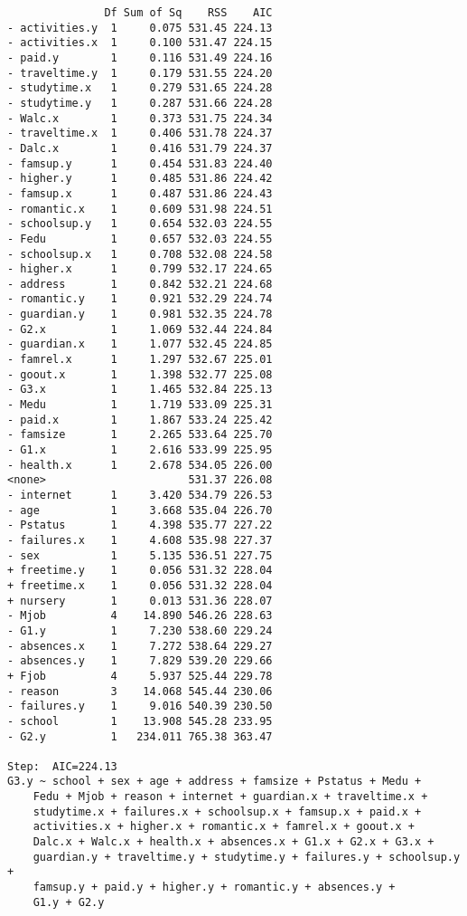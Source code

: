 \documentclass[11pt]{article}
\begin{document}
\begin{enumerate}
\begin{verbatim}
               Df Sum of Sq    RSS    AIC
- activities.y  1     0.075 531.45 224.13
- activities.x  1     0.100 531.47 224.15
- paid.y        1     0.116 531.49 224.16
- traveltime.y  1     0.179 531.55 224.20
- studytime.x   1     0.279 531.65 224.28
- studytime.y   1     0.287 531.66 224.28
- Walc.x        1     0.373 531.75 224.34
- traveltime.x  1     0.406 531.78 224.37
- Dalc.x        1     0.416 531.79 224.37
- famsup.y      1     0.454 531.83 224.40
- higher.y      1     0.485 531.86 224.42
- famsup.x      1     0.487 531.86 224.43
- romantic.x    1     0.609 531.98 224.51
- schoolsup.y   1     0.654 532.03 224.55
- Fedu          1     0.657 532.03 224.55
- schoolsup.x   1     0.708 532.08 224.58
- higher.x      1     0.799 532.17 224.65
- address       1     0.842 532.21 224.68
- romantic.y    1     0.921 532.29 224.74
- guardian.y    1     0.981 532.35 224.78
- G2.x          1     1.069 532.44 224.84
- guardian.x    1     1.077 532.45 224.85
- famrel.x      1     1.297 532.67 225.01
- goout.x       1     1.398 532.77 225.08
- G3.x          1     1.465 532.84 225.13
- Medu          1     1.719 533.09 225.31
- paid.x        1     1.867 533.24 225.42
- famsize       1     2.265 533.64 225.70
- G1.x          1     2.616 533.99 225.95
- health.x      1     2.678 534.05 226.00
<none>                      531.37 226.08
- internet      1     3.420 534.79 226.53
- age           1     3.668 535.04 226.70
- Pstatus       1     4.398 535.77 227.22
- failures.x    1     4.608 535.98 227.37
- sex           1     5.135 536.51 227.75
+ freetime.y    1     0.056 531.32 228.04
+ freetime.x    1     0.056 531.32 228.04
+ nursery       1     0.013 531.36 228.07
- Mjob          4    14.890 546.26 228.63
- G1.y          1     7.230 538.60 229.24
- absences.x    1     7.272 538.64 229.27
- absences.y    1     7.829 539.20 229.66
+ Fjob          4     5.937 525.44 229.78
- reason        3    14.068 545.44 230.06
- failures.y    1     9.016 540.39 230.50
- school        1    13.908 545.28 233.95
- G2.y          1   234.011 765.38 363.47

Step:  AIC=224.13
G3.y ~ school + sex + age + address + famsize + Pstatus + Medu + 
    Fedu + Mjob + reason + internet + guardian.x + traveltime.x + 
    studytime.x + failures.x + schoolsup.x + famsup.x + paid.x + 
    activities.x + higher.x + romantic.x + famrel.x + goout.x + 
    Dalc.x + Walc.x + health.x + absences.x + G1.x + G2.x + G3.x + 
    guardian.y + traveltime.y + studytime.y + failures.y + schoolsup.y + 
    famsup.y + paid.y + higher.y + romantic.y + absences.y + 
    G1.y + G2.y


\end{verbatim}
\end{enumerate}
\end{document}
